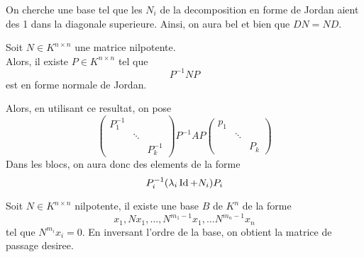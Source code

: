 \documentclass[../main.tex]{subfiles}
\begin{document}
On cherche une base tel que les $N_i$ de la decomposition en forme de Jordan aient des 1 dans la diagonale superieure.
Ainsi, on aura bel et bien que $DN=ND$.
 \begin{thm}
	 Soit $N \in K^{n\times n}$ une matrice nilpotente.\\
	 Alors, il existe $P \in K^{n\times n}$ tel que
	 \[ 
	 P^{-1}NP
	 \]
	 est en forme normale de Jordan.
	
\end{thm}
Alors, en utilisant ce resultat, on pose
\[ 
\begin{pmatrix}
	P_1^{-1} & & \\
		 & \ddots &\\
		 & & P_k^{-1}
\end{pmatrix} P^{-1} AP \begin{pmatrix}
	p_1 & & \\
		 & \ddots &\\
		 & & P_k
\end{pmatrix}
\]
Dans les blocs, on aura donc des elements de la forme
\[ 
	P_i^{-1}( \lambda_i \operatorname*{Id} +N_i) P_i
\]
\begin{thm}
\end{thm}
Soit $N \in K^{n\times n}$ nilpotente, il existe une base $B$ de $K^{n}$ de la forme
\[ 
x_1,Nx_1 , \ldots, N^{m_1-1}x_1, \ldots N^{m_n-1}x_n
\]
tel que $N^{m_i}x_i =0$.
En inversant l'ordre de la base, on obtient la matrice de passage desiree.
\end{document}
